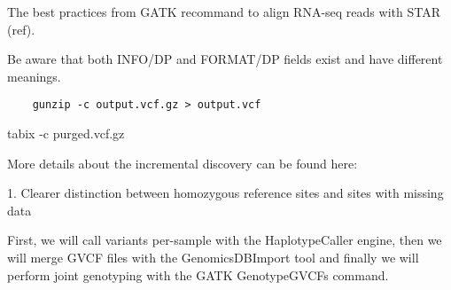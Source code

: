 The best practices from GATK recommand to align RNA-seq reads with STAR (ref). 

Be aware that both INFO/DP and FORMAT/DP fields exist and have different meanings.

\begin{verbatim}
	gunzip -c output.vcf.gz > output.vcf
\end{verbatim}




tabix -c purged.vcf.gz


More details about the incremental discovery can be found here:

1. Clearer distinction between homozygous reference sites and sites with missing data

First, we will call variants per-sample with the HaplotypeCaller engine, then we will merge GVCF files with the GenomicsDBImport tool and finally we will perform joint genotyping with the GATK GenotypeGVCFs command.
